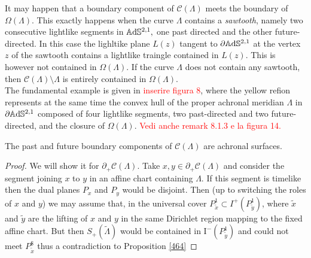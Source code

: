 \begin{observation}\label{465}
    It may happen that a boundary component of $\mathcal{C}(\Lambda)$ meets the boundary of $\Omega(\Lambda)$. This exactly happens when the curve $\Lambda$ contains a \textit{sawtooth}, namely two consecutive lightlike segments in $\mathbb{A}\mathrm{d}\mathbb{S}^{2,1},$ one past directed and the other future-directed. In this case the lighltike plane $L(z)$ tangent to $\partial\mathbb{A}\mathrm{d}\mathbb{S}^{2,1}$ at the vertex $z$ of the sawtooth contains a lightlike traingle contained in $L(z)$. This is however not contained in $\Omega(\Lambda)$. If the curve $\Lambda$ does not contain any sawtooth, then $\mathcal{C}({\Lambda})\setminus\Lambda$ is entirely contained in $\Omega(\Lambda)$.\\
    The fundamental example is given in \textcolor{red}{inserire figura 8}, where the yellow refion represents at the same time the convex hull of the proper achronal meridian $\Lambda$ in $\partial\mathbb{A}\mathrm{d}\mathbb{S}^{2,1}$ composed of four lightlike segments, two past-directed and two future-directed, and the closure of $\Omega(\Lambda).$ \textcolor{red}{Vedi anche remark 8.1.3 e la figura 14.} 
\end{observation}

\begin{proposition}\label{466}
The past and future boundary components of $\mathcal{C}(\Lambda)$ are achronal surfaces.
\end{proposition}
\begin{proof}
    We will show it for $\partial_+\mathcal{C}(\Lambda)$. Take $x,y\in\partial_+\mathcal{C}(\Lambda)$ and consider the segment joining $x$ to $y$ in an affine chart containing $\Lambda$. If this segment is timelike then the dual planes $P_x$ and $P_y$ would be disjoint. Then (up to switching the roles of $x$ and $y$) we may assume that, in the universal cover $P_{\widetilde{x}}^1\subset I^+(P_{\widetilde{y}}^1)$, where $\widetilde{x}$ and $\widetilde{y}$ are the lifting of $x$ and $y$ in the same Dirichlet region mapping to the fixed affine chart. But then $S_+(\widetilde{\Lambda})$ would be contained in $\text{I}^-(P_{\widetilde{y}}^1)$ and could not meet $P_{\widetilde{x}}^\$$ thus a contradiction to Proposition \ref{464}
\end{proof}

